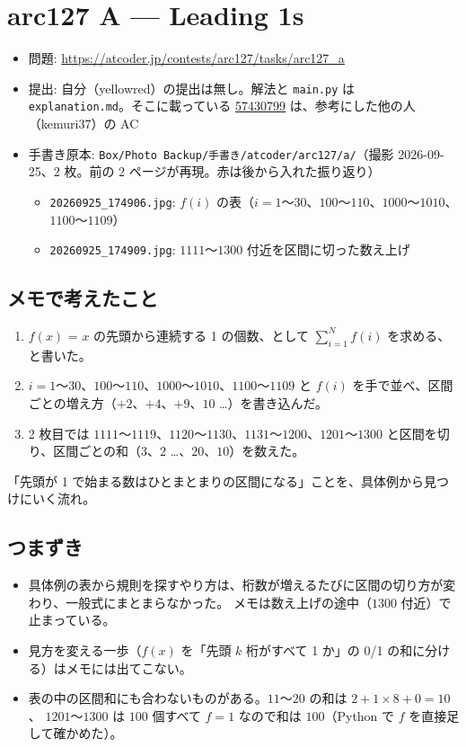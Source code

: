 \documentclass[a4paper]{article}
\begin{document}
\section*{arc127 A --- Leading 1s}

\begin{itemize}
  \item 問題: \url{https://atcoder.jp/contests/arc127/tasks/arc127_a}
  \item 提出: 自分（yellowred）の提出は無し。解法と \texttt{main.py} は \texttt{explanation.md}。そこに載っている
    \href{https://atcoder.jp/contests/arc127/submissions/57430799}{57430799} は、参考にした他の人（kemuri37）の AC
  \item 手書き原本: \texttt{Box/Photo Backup/手書き/atcoder/arc127/a/}（撮影 2026-09-25、2 枚。前の 2 ページが再現。赤は後から入れた振り返り）
  \begin{itemize}
    \item \texttt{20260925\_174906.jpg}: $f(i)$ の表（$i = 1$〜$30$、$100$〜$110$、$1000$〜$1010$、$1100$〜$1109$）
    \item \texttt{20260925\_174909.jpg}: $1111$〜$1300$ 付近を区間に切った数え上げ
  \end{itemize}
\end{itemize}

\subsection*{メモで考えたこと}
\begin{enumerate}
  \item $f(x)$ = $x$ の先頭から連続する 1 の個数、として $\sum_{i=1}^{N} f(i)$ を求める、と書いた。
  \item $i = 1$〜$30$、$100$〜$110$、$1000$〜$1010$、$1100$〜$1109$ と $f(i)$ を手で並べ、区間ごとの増え方（$+2$、$+4$、$+9$、$10$ …）を書き込んだ。
  \item 2 枚目では $1111$〜$1119$、$1120$〜$1130$、$1131$〜$1200$、$1201$〜$1300$ と区間を切り、区間ごとの和（$3$、$2$ …、$20$、$10$）を数えた。
\end{enumerate}
「先頭が 1 で始まる数はひとまとまりの区間になる」ことを、具体例から見つけにいく流れ。

\subsection*{つまずき}
\begin{itemize}
  \item 具体例の表から規則を探すやり方は、桁数が増えるたびに区間の切り方が変わり、一般式にまとまらなかった。
    メモは数え上げの途中（$1300$ 付近）で止まっている。
  \item 見方を変える一歩（$f(x)$ を「先頭 $k$ 桁がすべて 1 か」の 0/1 の和に分ける）はメモには出てこない。
  \item 表の中の区間和にも合わないものがある。$11$〜$20$ の和は $2 + 1\times 8 + 0 = 10$、
    $1201$〜$1300$ は $100$ 個すべて $f = 1$ なので和は $100$（Python で $f$ を直接足して確かめた）。
\end{itemize}
\end{document}
